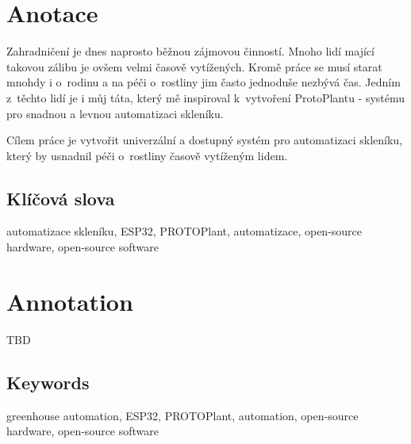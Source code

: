\documentclass{template/socthesis}
\author{Petr Štourač}
\begin{document}
\maketitle



\pagestyle{empty}

\section*{Anotace}
Zahradničení je dnes naprosto běžnou zájmovou činností. Mnoho lidí mající takovou zálibu je ovšem velmi časově vytížených. Kromě práce se musí starat mnohdy i o~rodinu a na péči o~rostliny jim často jednoduše nezbývá čas. Jedním z~těchto lidí je i můj táta, který mě inspiroval k~vytvoření ProtoPlantu - systému pro snadnou a levnou automatizaci skleníku. 

Cílem práce je vytvořit univerzální a dostupný systém pro automatizaci skleníku, který by usnadnil péči o~rostliny časově vytíženým lidem. 

\subsection*{Klíčová slova}
automatizace skleníku, ESP32, PROTOPlant, automatizace, open-source hardware, open-source software

\vspace{20mm}

\section*{Annotation}
TBD

\subsection*{Keywords}
greenhouse automation, ESP32, PROTOPlant, automation, open-source hardware, open-source software

\newpage
\pagestyle{plain}

\tableofcontents %

\setcounter{figure}{0}
\setcounter{table}{0}
\newpage
\end{document}

